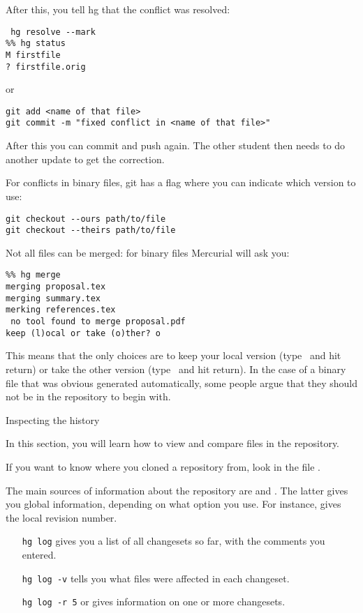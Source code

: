 After this, you tell hg that the conflict was resolved:
\begin{verbatim}
 hg resolve --mark
%% hg status
M firstfile
? firstfile.orig
\end{verbatim}
or
\begin{verbatim}
git add <name of that file>
git commit -m "fixed conflict in <name of that file>"
\end{verbatim}
After this you can commit and push again.
The other student then needs to do another update to get the
correction.

For conflicts in binary files, git has a flag where you can indicate
which version to use:
\begin{verbatim}
git checkout --ours path/to/file
git checkout --theirs path/to/file
\end{verbatim}

Not all files can be merged: for binary files Mercurial will ask you:
\begin{verbatim}
%% hg merge
merging proposal.tex
merging summary.tex
merking references.tex
 no tool found to merge proposal.pdf
keep (l)ocal or take (o)ther? o
\end{verbatim}
This means that the only choices are to keep your local version
(type~ and hit return) or take the other version (type~ and
hit return). In the case of a binary file that was obvious generated
automatically, some people argue that they should not be in the
repository to begin with.

 {Inspecting the history}

\begin{purpose}
  In this section, you will learn how to view and compare files in the
  repository.
\end{purpose}

If you want to know where you cloned a repository from, look in the
file .

The main sources of information about the repository are 
and . The latter gives you global information, depending
on what option you use. For instance,  gives the local revision
number.
\begin{itemize}
\item [\texttt{hg log}] gives you a list of all changesets so far,
  with the comments you entered.
\item [\texttt{hg log -v}] tells you what files were affected in each changeset.
\item [\texttt{hg log -r 5}] or  gives information on
  one or more changesets.
\end{itemize}

